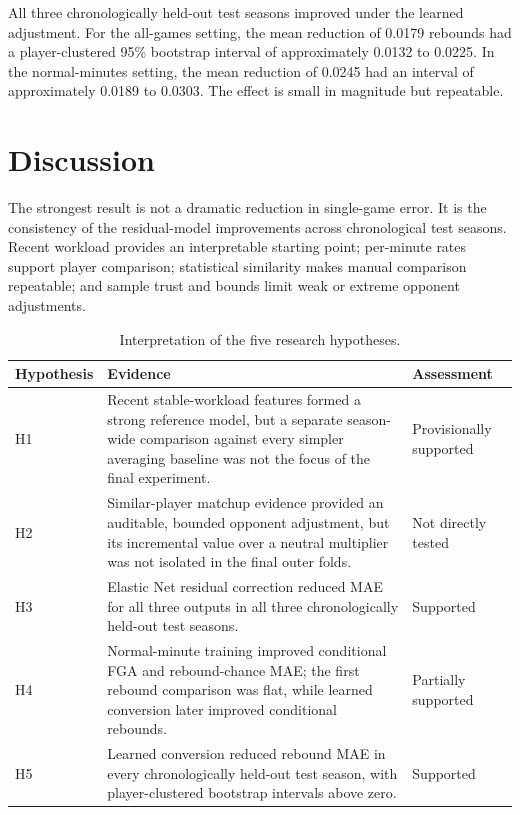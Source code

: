 \documentclass[11pt]{article}
\begin{document}
All three chronologically held-out test seasons improved under the learned adjustment. For the
all-games setting, the mean reduction of 0.0179 rebounds had a
player-clustered 95\% bootstrap interval of approximately 0.0132 to 0.0225. In
the normal-minutes setting, the mean reduction of 0.0245 had an interval of
approximately 0.0189 to 0.0303. The effect is small in magnitude but repeatable.

\section{Discussion}

The strongest result is not a dramatic reduction in single-game error. It is
the consistency of the residual-model improvements across chronological test
seasons. Recent workload provides an interpretable starting point; per-minute
rates support player comparison; statistical similarity makes manual
comparison repeatable; and sample trust and bounds limit weak or extreme
opponent adjustments.

\begin{table}[H]
\centering
\caption{Interpretation of the five research hypotheses.}
\label{tab:hypotheses}
\small
\begin{tabularx}{\textwidth}{lXl}
\toprule
Hypothesis & Evidence & Assessment \\
\midrule
H1 & Recent stable-workload features formed a strong reference model, but a
separate season-wide comparison against every simpler averaging baseline was
not the focus of the final experiment. & Provisionally supported \\
H2 & Similar-player matchup evidence provided an auditable, bounded opponent
adjustment, but its incremental value over a neutral multiplier was not
isolated in the final outer folds. & Not directly tested \\
H3 & Elastic Net residual correction reduced MAE for all three outputs in all
three chronologically held-out test seasons. & Supported \\
H4 & Normal-minute training improved conditional FGA and rebound-chance MAE;
the first rebound comparison was flat, while learned conversion later improved
conditional rebounds. & Partially supported \\
H5 & Learned conversion reduced rebound MAE in every chronologically held-out test season, with
player-clustered bootstrap intervals above zero. & Supported \\
\bottomrule
\end{tabularx}
\end{table}
\end{document}
